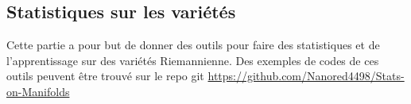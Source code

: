 \begin{partbacktext}
\part{Statistiques sur les variétés}
\noindent
Cette partie a pour but de donner des outils pour faire des statistiques et de l'apprentissage sur des variétés Riemannienne. Des exemples de codes de ces outils peuvent être trouvé sur le repo git \url{https://github.com/Nanored4498/Stats-on-Manifolds}
\end{partbacktext}
